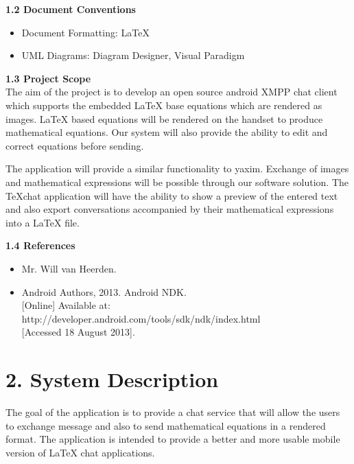 \documentclass[29pt,a4paper]{moderncv}
\begin{document}
		\noindent \textbf{1.2 Document Conventions}
			\begin{itemize}
				\item Document Formatting: LaTeX
				\item UML Diagrams: Diagram Designer, Visual Paradigm
			\end{itemize}
		\vspace{5mm}
		
		\noindent \textbf{1.3 Project Scope}
			\\The aim of the project is to develop an open source android XMPP chat client which supports the embedded LaTeX base equations which are rendered as images. LaTeX based equations will be rendered on the handset to produce mathematical equations. Our system will also provide the ability to edit and correct equations before sending.
			
			\parindent 5mm The application will provide a similar functionality to yaxim. Exchange of images and mathematical expressions will be possible through our software solution. The TeXchat application will have the ability to show a preview of the entered text and also export conversations accompanied by their mathematical expressions into a LaTeX file.
			
		\vspace{5mm}
		
	\noindent \textbf{1.4 References}
		\begin{itemize}
		\item Mr. Will van Heerden.
		\item Android Authors, 2013. Android NDK.\\ {[Online]} Available at: http://developer.android.com/tools/sdk/ndk/index.html
			\\{[Accessed 18 August 2013].}
		\end{itemize}
		\vspace{5mm}
		
\newpage
	\section*{\textbf{2. System Description}}
	\vspace{4mm}
		\noindent The goal of the application is to provide a chat service that will allow the users to exchange message and also to send mathematical equations in a rendered format. The application is intended to provide a better and more usable mobile version of LaTeX chat applications.\\ 
		
\end{document}
